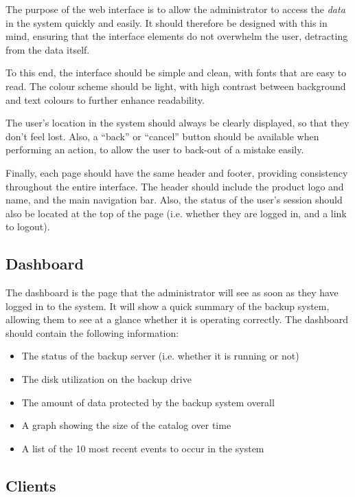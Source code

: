 The purpose of the web interface is to allow the administrator to access the
\emph{data} in the system quickly and easily. It should therefore be designed
with this in mind, ensuring that the interface elements do not overwhelm the
user, detracting from the data itself.

To this end, the interface should be simple and clean, with fonts that are easy
to read. The colour scheme should be light, with high contrast between
background and text colours to further enhance readability.

The user's location in the system should always be clearly displayed, so that
they don't feel lost. Also, a ``back'' or ``cancel'' button should be available
when performing an action, to allow the user to back-out of a mistake easily.

Finally, each page should have the same header and footer, providing
consistency throughout the entire interface. The header should include the
product logo and name, and the main navigation bar. Also, the status of the
user's session should also be located at the top of the page (i.e. whether they
are logged in, and a link to logout).

\subsection{Dashboard}

The dashboard is the page that the administrator will see as soon as they have
logged in to the system. It will show a quick summary of the backup system,
allowing them to see at a glance whether it is operating correctly. The
dashboard should contain the following information:

\begin{itemize}
    \item The status of the backup server (i.e. whether it is running or not)
    \item The disk utilization on the backup drive
    \item The amount of data protected by the backup system overall
    \item A graph showing the size of the catalog over time
    \item A list of the 10 most recent events to occur in the system
\end{itemize}

\subsection{Clients}


